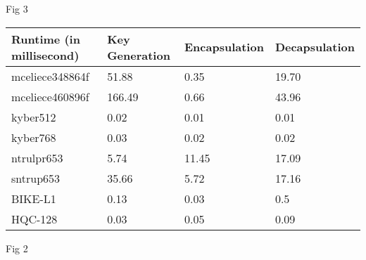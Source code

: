 \documentclass{article}
\begin{document}
Fig 3\newline
\begin{table}[]
\begin{tabular}{|l|l|l|l|}
\hline
Runtime (in millisecond) & Key Generation & Encapsulation & Decapsulation \\ \hline
mceliece348864f          & 51.88          & 0.35          & 19.70         \\ \hline
mceliece460896f          & 166.49         & 0.66          & 43.96         \\ \hline
kyber512                 & 0.02           & 0.01          & 0.01          \\ \hline
kyber768                 & 0.03           & 0.02          & 0.02          \\ \hline
ntrulpr653               & 5.74           & 11.45         & 17.09         \\ \hline
sntrup653                & 35.66          & 5.72          & 17.16         \\ \hline
BIKE-L1                  & 0.13           & 0.03          & 0.5           \\ \hline
HQC-128                  & 0.03           & 0.05          & 0.09          \\ \hline
\end{tabular}
\end{table}
Fig 2 \newline
\end{document}
